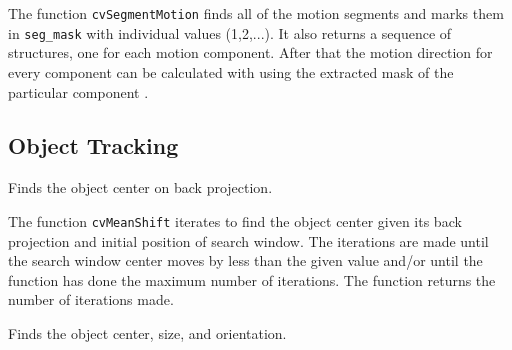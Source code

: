 The function \texttt{cvSegmentMotion} finds all of the motion segments and
marks them in \texttt{seg\_mask} with individual values (1,2,...). It
also returns a sequence of 
structures, one for each motion component. After that the
motion direction for every component can be calculated with
 using the extracted mask of the particular
component .

\subsection{Object Tracking}

\label{MeanShift}

Finds the object center on back projection.


\begin{description}
\end{description}

The function \texttt{cvMeanShift} iterates to find the object center
given its back projection and initial position of search window. The
iterations are made until the search window center moves by less than
the given value and/or until the function has done the maximum number
of iterations. The function returns the number of iterations made.

\label{CamShift}

Finds the object center, size, and orientation.


